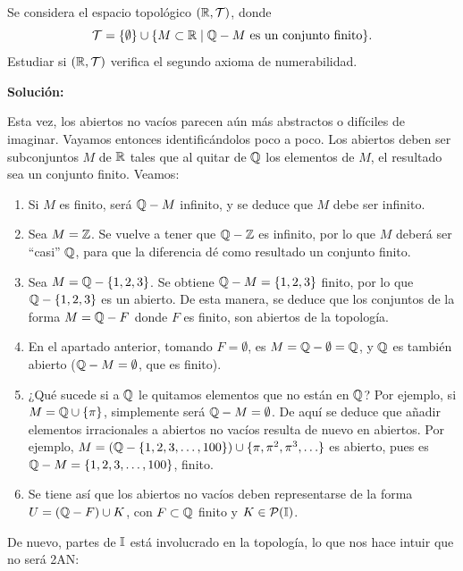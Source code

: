 \begin{ex}
    \label{Ejercicio:Rcof_irracionales}
    Se considera el espacio topológico \((\mathbb{R}, \mathcal{T})\), donde
    \[
        \mathcal{T} = \{\emptyset\} \cup \{M \subset \mathbb{R} \mid \mathbb{Q} - M \text{ es un conjunto finito}\}.
    \]
    Estudiar si \((\mathbb{R}, \mathcal{T})\) verifica el segundo axioma de numerabilidad.

    \bigskip

    \textbf{Solución:}

    Esta vez, los abiertos no vacíos parecen aún más abstractos o difíciles de imaginar. Vayamos entonces identificándolos poco a poco. Los abiertos deben ser subconjuntos $M$ de $\mathbb{R}$ tales que al quitar de $\mathbb{Q}$ los elementos de $M$, el resultado sea un conjunto finito. Veamos:

    \begin{enumerate}[topsep=5pt, itemsep=0pt, label=--]
        \item Si $M$ es finito, será $\mathbb{Q} - M$ infinito, y se deduce que $M$ debe ser infinito.
        \item Sea $M = \mathbb{Z}$. Se vuelve a tener que $\mathbb{Q} - \mathbb{Z}$ es infinito, por lo que $M$ deberá ser ``casi'' $\mathbb{Q}$, para que la diferencia dé como resultado un conjunto finito.
        \item Sea $M = \mathbb{Q} - \{1,2,3\}$. Se obtiene $\mathbb{Q} - M = \{1,2,3\}$ finito, por lo que $\mathbb{Q} - \{1,2,3\}$ es un abierto. De esta manera, se deduce que los conjuntos de la forma $M = \mathbb{Q} - F$ donde $F$ es finito, son abiertos de la topología.
        \item En el apartado anterior, tomando $F = \emptyset$, es $M = \mathbb{Q} - \emptyset = \mathbb{Q}$, y $\mathbb{Q}$ es también abierto ($\mathbb{Q} - M = \emptyset$, que es finito).
        \item ¿Qué sucede si a $\mathbb{Q}$ le quitamos elementos que no están en $\mathbb{Q}$? Por ejemplo, si $M = \mathbb{Q} \cup \{\pi\}$, simplemente será $\mathbb{Q} - M = \emptyset$. De aquí se deduce que añadir elementos irracionales a abiertos no vacíos resulta de nuevo en abiertos. Por ejemplo, $M = (\mathbb{Q} - \{1,2,3, \ldots, 100\}) \cup \{\pi,\pi^2, \pi^3, \ldots\}$ es abierto, pues es $\mathbb{Q} - M = \{1,2,3, \ldots, 100\}$, finito.
        \item Se tiene así que los abiertos no vacíos deben representarse de la forma $U = (\mathbb{Q} - F) \cup K$, con $F \subset \mathbb{Q}$ finito y $K \in \mathcal{P}(\mathbb{I})$.
    \end{enumerate}

    De nuevo, partes de $\mathbb{I}$ está involucrado en la topología, lo que nos hace intuir que no será 2AN:


\end{ex}
